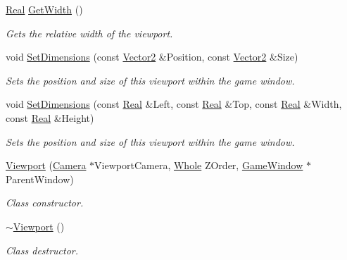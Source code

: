\begin{DoxyCompactItemize}
\hyperlink{namespaceMezzanine_a726731b1a7df72bf3583e4a97282c6f6}{Real} \hyperlink{classMezzanine_1_1Viewport_ad3749dc4c31a76ac82a4a4641e97647b}{GetWidth} ()
\begin{DoxyCompactList}\small\item\em Gets the relative width of the viewport. \item\end{DoxyCompactList}\item 
void \hyperlink{classMezzanine_1_1Viewport_a3f92528a6302e5e52fb8fb2f56f14828}{SetDimensions} (const \hyperlink{classMezzanine_1_1Vector2}{Vector2} \&Position, const \hyperlink{classMezzanine_1_1Vector2}{Vector2} \&Size)
\begin{DoxyCompactList}\small\item\em Sets the position and size of this viewport within the game window. \item\end{DoxyCompactList}\item 
void \hyperlink{classMezzanine_1_1Viewport_acd7fe51cfd7991dcb6d416cf05c6277b}{SetDimensions} (const \hyperlink{namespaceMezzanine_a726731b1a7df72bf3583e4a97282c6f6}{Real} \&Left, const \hyperlink{namespaceMezzanine_a726731b1a7df72bf3583e4a97282c6f6}{Real} \&Top, const \hyperlink{namespaceMezzanine_a726731b1a7df72bf3583e4a97282c6f6}{Real} \&Width, const \hyperlink{namespaceMezzanine_a726731b1a7df72bf3583e4a97282c6f6}{Real} \&Height)
\begin{DoxyCompactList}\small\item\em Sets the position and size of this viewport within the game window. \item\end{DoxyCompactList}\item 
\hyperlink{classMezzanine_1_1Viewport_a6bcb912b24cb7d4e0fa4085bf360e997}{Viewport} (\hyperlink{classMezzanine_1_1Camera}{Camera} $\ast$ViewportCamera, \hyperlink{namespaceMezzanine_adcbb6ce6d1eb4379d109e51171e2e493}{Whole} ZOrder, \hyperlink{classMezzanine_1_1GameWindow}{GameWindow} $\ast$ParentWindow)
\begin{DoxyCompactList}\small\item\em Class constructor. \item\end{DoxyCompactList}\item 
\hypertarget{classMezzanine_1_1Viewport_a70b5324edd95ce30cceddf23be31e60c}{
\hyperlink{classMezzanine_1_1Viewport_a70b5324edd95ce30cceddf23be31e60c}{$\sim$Viewport} ()}
\label{classMezzanine_1_1Viewport_a70b5324edd95ce30cceddf23be31e60c}

\begin{DoxyCompactList}\small\item\em Class destructor. \item\end{DoxyCompactList}\end{DoxyCompactItemize}
